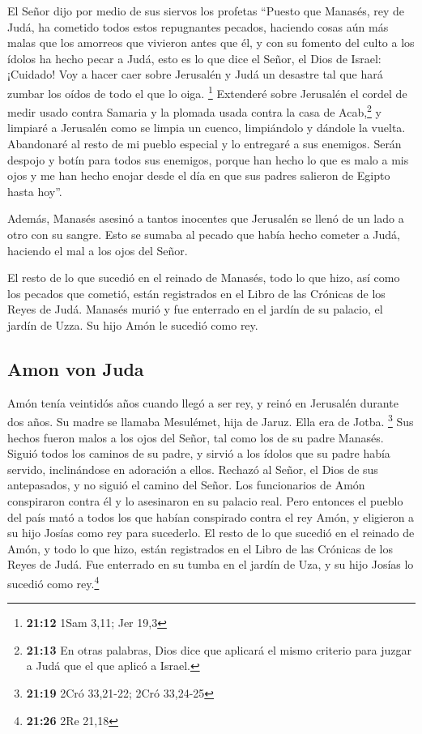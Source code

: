  El Señor dijo por medio de sus siervos los profetas
 ``Puesto que Manasés, rey de Judá, ha cometido todos
estos repugnantes pecados, haciendo cosas aún más malas que los amorreos
que vivieron antes que él, y con su fomento del culto a los ídolos ha
hecho pecar a Judá,  esto es lo que dice el Señor, el
Dios de Israel: ¡Cuidado! Voy a hacer caer sobre Jerusalén y Judá un
desastre tal que hará zumbar los oídos de todo el que lo oiga.
\footnote{\textbf{21:12} 1Sam 3,11; Jer 19,3}  Extenderé
sobre Jerusalén el cordel de medir usado contra Samaria y la plomada
usada contra la casa de Acab,\footnote{\textbf{21:13} En otras palabras,
  Dios dice que aplicará el mismo criterio para juzgar a Judá que el que
  aplicó a Israel.} y limpiaré a Jerusalén como se limpia un cuenco,
limpiándolo y dándole la vuelta.  Abandonaré al resto de
mi pueblo especial y lo entregaré a sus enemigos. Serán despojo y botín
para todos sus enemigos,  porque han hecho lo que es malo
a mis ojos y me han hecho enojar desde el día en que sus padres salieron
de Egipto hasta hoy''.

 Además, Manasés asesinó a tantos inocentes que Jerusalén
se llenó de un lado a otro con su sangre. Esto se sumaba al pecado que
había hecho cometer a Judá, haciendo el mal a los ojos del Señor.

 El resto de lo que sucedió en el reinado de Manasés,
todo lo que hizo, así como los pecados que cometió, están registrados en
el Libro de las Crónicas de los Reyes de Judá.  Manasés
murió y fue enterrado en el jardín de su palacio, el jardín de Uzza. Su
hijo Amón le sucedió como rey.

\hypertarget{amon-von-juda}{%
\subsection{Amon von Juda}\label{amon-von-juda}}

 Amón tenía veintidós años cuando llegó a ser rey, y
reinó en Jerusalén durante dos años. Su madre se llamaba Mesulémet, hija
de Jaruz. Ella era de Jotba. \footnote{\textbf{21:19} 2Cró 33,21-22;
  2Cró 33,24-25}  Sus hechos fueron malos a los ojos del
Señor, tal como los de su padre Manasés.  Siguió todos
los caminos de su padre, y sirvió a los ídolos que su padre había
servido, inclinándose en adoración a ellos.  Rechazó al
Señor, el Dios de sus antepasados, y no siguió el camino del Señor.
 Los funcionarios de Amón conspiraron contra él y lo
asesinaron en su palacio real.  Pero entonces el pueblo
del país mató a todos los que habían conspirado contra el rey Amón, y
eligieron a su hijo Josías como rey para sucederlo.  El
resto de lo que sucedió en el reinado de Amón, y todo lo que hizo, están
registrados en el Libro de las Crónicas de los Reyes de Judá.
 Fue enterrado en su tumba en el jardín de Uza, y su hijo
Josías lo sucedió como rey.\footnote{\textbf{21:26} 2Re 21,18}

